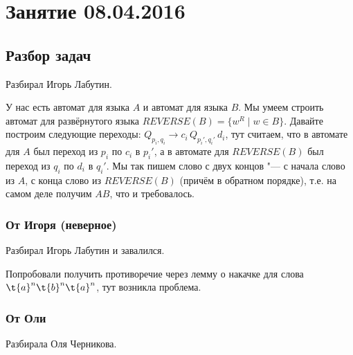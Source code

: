 \chapter{Занятие 08.04.2016}
\section{Разбор задач}

	Разбирал Игорь Лабутин.

	У нас есть автомат для языка $A$ и автомат для языка $B$.
	Мы умеем строить автомат для развёрнутого языка $REVERSE(B) = \{ w^R \mid w \in B \}$.
	Давайте построим следующие переходы: $Q_{p_i,q_i} \to c_i\, Q_{p_i', q_i'}\,d_i$,
	тут считаем, что в автомате для $A$ был переход из $p_i$ по $c_i$ в $p_i'$,
	а в автомате для $REVERSE(B)$ был переход из $q_i$ по $d_i$ в $q_i'$.
	Мы так пишем слово с двух концов "--- с начала слово из $A$, с конца слово из $REVERSE(B)$
	(причём в обратном порядке), т.е. на самом деле получим $AB$, что и требовалось. 

	\TODO
	\subsection{От Игоря (неверное)}
		Разбирал Игорь Лабутин и завалился.

		Попробовали получить противоречие через лемму о накачке для слова $\t{a}^n\t{b}^n\t{a}^n$,
		тут возникла проблема.

	\subsection{От Оли}
		Разбирала Оля Черникова.

